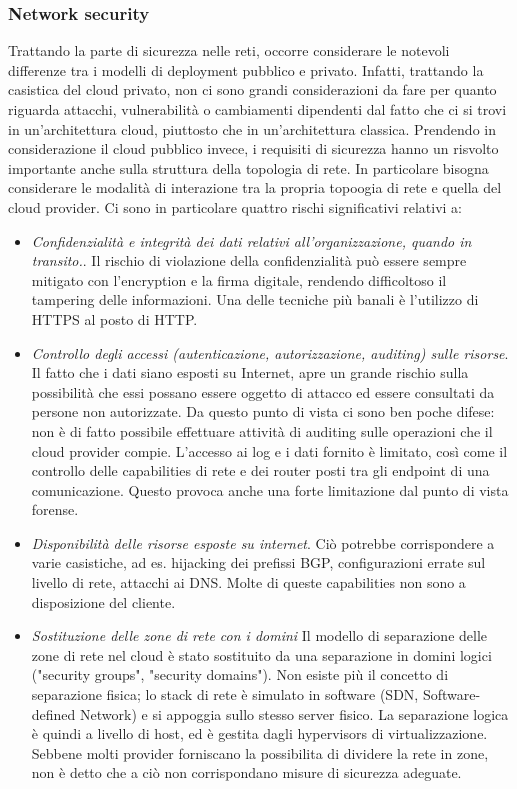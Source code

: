 \subsubsection{Network security}
Trattando la parte di sicurezza nelle reti, occorre considerare le notevoli differenze tra i modelli di deployment pubblico e privato.  
Infatti, trattando la casistica del cloud privato, non ci sono grandi considerazioni da fare per quanto riguarda attacchi, vulnerabilità o cambiamenti dipendenti dal fatto che ci si trovi in un'architettura cloud, piuttosto che in un'architettura classica.\cite{CloudSecurityBook}
Prendendo in considerazione il cloud pubblico invece, i requisiti di sicurezza hanno un risvolto importante anche sulla struttura della topologia di rete. In particolare bisogna considerare le modalità di interazione tra la propria topoogia di rete e quella del cloud provider.\cite{CloudSecurityBook} Ci sono in particolare quattro rischi significativi relativi a:
\begin{itemize}
\item \textit{Confidenzialità e integrità dei dati relativi all'organizzazione, quando in transito.}.
Il rischio di violazione della confidenzialità può essere sempre mitigato con l'encryption e la firma digitale, rendendo difficoltoso il tampering delle informazioni. Una delle tecniche più banali è l'utilizzo di HTTPS al posto di HTTP.
\item \textit{Controllo degli accessi (autenticazione, autorizzazione, auditing) sulle risorse}. Il fatto che i dati siano esposti su Internet, apre un grande rischio sulla possibilità che essi possano essere oggetto di attacco ed essere consultati da persone non autorizzate. Da questo punto di vista ci sono ben poche difese: non è di fatto possibile effettuare attività di auditing sulle operazioni che il cloud provider compie. L'accesso ai log e i dati fornito è limitato, così come il controllo delle capabilities di rete e dei router posti tra gli endpoint di una comunicazione.
Questo provoca anche una forte limitazione dal punto di vista forense.
\item \textit{Disponibilità delle risorse esposte su internet}. Ciò potrebbe corrispondere a varie casistiche, ad es. hijacking dei prefissi BGP, configurazioni errate sul livello di rete, attacchi ai DNS. Molte di queste capabilities non sono a disposizione del cliente. 
\item \textit{Sostituzione delle zone di rete con i domini}
Il modello di separazione delle zone di rete nel cloud è stato sostituito da una separazione in domini logici ("security groups", "security domains"). Non esiste più il concetto di separazione fisica; lo stack di rete è simulato in software (SDN, Software-defined Network) e si appoggia sullo stesso server fisico. La separazione logica è quindi a livello di host, ed è gestita dagli hypervisors di virtualizzazione.
Sebbene molti provider forniscano la possibilita di dividere la rete in zone, non è detto che a ciò non corrispondano misure di sicurezza adeguate.\cite{CloudSecurityBook}
\end{itemize}

